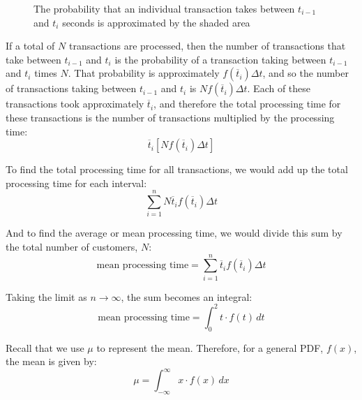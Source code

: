 \begin{figure}[htbp]
    \centering
    \label{fig:mean}
    \caption{The probability that an individual transaction takes between 
    $t_{i-1}$ and $t_i$ seconds is approximated by the shaded area}
\end{figure}

If a total of $N$ transactions are processed, then the number of transactions 
that take between $t_{i-1}$ and $t_i$ is the probability of a transaction 
taking between $t_{i-1}$ and $t_i$ times $N$. That probability is approximately $f(\overline{t}_i) \Delta t$, and so the number of transactions taking between 
$t_{i-1}$ and $t_i$ is $Nf(\overline{t}_i) \Delta t$. Each of these 
transactions took approximately $\overline{t}_i$, and therefore the total 
processing time for these transactions is the number of transactions multiplied
by the processing time:
$$\overline{t}_i \left[ N f(\overline{t}_i) \Delta t \right]$$

To find the total processing time for all transactions, we would add up the 
total processing time for each interval:
$$\sum_{i = 1}^n N \overline{t}_i f(\overline{t}_i) \Delta t$$

And to find the average or mean processing time, we would divide this sum by 
the total number of customers, $N$:
$$\text{mean processing time} = \sum_{i = 1}^n \overline{t}_i f(\overline{
t}_i) \Delta t$$

Taking the limit as $n \to \infty$, the sum becomes an integral:
$$\text{mean processing time} = \int_0^2 t \cdot f(t)\,dt$$

Recall that we use $\mu$ to represent the mean. Therefore, for a general PDF, 
$f(x)$, the mean is given by:
$$\mu = \int_{-\infty}^{\infty} x \cdot f(x)\,dx$$

